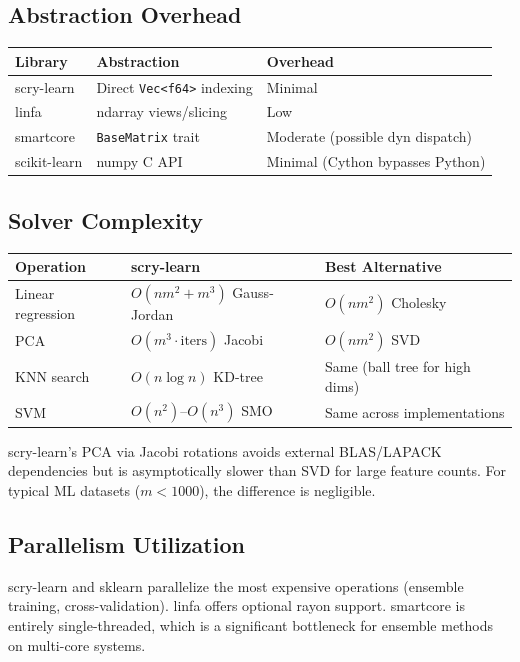 \documentclass[11pt,a4paper]{article}
\begin{document}
\subsection{Abstraction Overhead}

\begin{center}
\begin{tabular}{lll}
\toprule
\textbf{Library} & \textbf{Abstraction} & \textbf{Overhead} \\
\midrule
scry-learn & Direct \texttt{Vec<f64>} indexing & Minimal \\
linfa & ndarray views/slicing & Low \\
smartcore & \texttt{BaseMatrix} trait & Moderate (possible dyn dispatch) \\
scikit-learn & numpy C API & Minimal (Cython bypasses Python) \\
\bottomrule
\end{tabular}
\end{center}

\subsection{Solver Complexity}

\begin{center}
\begin{tabular}{lll}
\toprule
\textbf{Operation} & \textbf{scry-learn} & \textbf{Best Alternative} \\
\midrule
Linear regression & $O(nm^2 + m^3)$ Gauss-Jordan & $O(nm^2)$ Cholesky \\
PCA & $O(m^3 \cdot \text{iters})$ Jacobi & $O(nm^2)$ SVD \\
KNN search & $O(n\log n)$ KD-tree & Same (ball tree for high dims) \\
SVM & $O(n^2)$--$O(n^3)$ SMO & Same across implementations \\
\bottomrule
\end{tabular}
\end{center}

scry-learn's PCA via Jacobi rotations avoids external BLAS/LAPACK dependencies but is asymptotically slower than SVD for large feature counts. For typical ML datasets ($m < 1000$), the difference is negligible.

\subsection{Parallelism Utilization}

scry-learn and sklearn parallelize the most expensive operations (ensemble training, cross-validation). linfa offers optional rayon support. smartcore is entirely single-threaded, which is a significant bottleneck for ensemble methods on multi-core systems.
\end{document}
